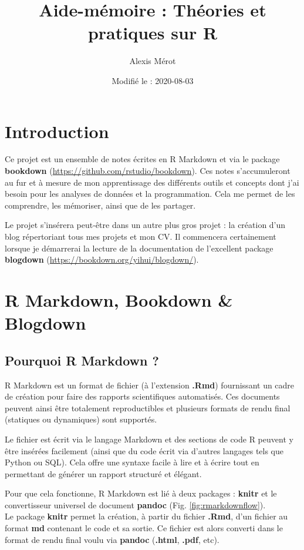 \documentclass[
]{book}
\title{Aide-mémoire : Théories et pratiques sur R}
\author{Alexis Mérot}
\date{Modifié le : 2020-08-03}
\begin{document}
\maketitle

{
\setcounter{tocdepth}{1}
\tableofcontents
}
\hypertarget{introduction}{%
\chapter*{Introduction}\label{introduction}}

Ce projet est un ensemble de notes écrites en R Markdown \citep{R-rmarkdown} et via
le package \textbf{bookdown} (\url{https://github.com/rstudio/bookdown}). Ces notes
s'accumuleront au fur et à mesure de mon apprentissage des différents outils et
concepts dont j'ai besoin pour les analyses de données et la programmation. Cela
me permet de les comprendre, les mémoriser, ainsi que de les partager.

Le projet s'insérera peut-être dans un autre plus gros projet : la création d'un
blog répertoriant tous mes projets et mon CV. Il commencera certainement lorsque
je démarrerai la lecture de la documentation de l'excellent package \textbf{blogdown}
(\url{https://bookdown.org/yihui/blogdown/}).

\hypertarget{rmarkdown}{%
\chapter{R Markdown, Bookdown \& Blogdown}\label{rmarkdown}}

\hypertarget{pourquoi-rmarkdown}{%
\section{Pourquoi R Markdown ?}\label{pourquoi-rmarkdown}}

R Markdown est un format de fichier (à l'extension \textbf{.Rmd}) fournissant un cadre
de création pour faire des rapports scientifiques automatisés. Ces documents
peuvent ainsi être totalement reproductibles et plusieurs formats de rendu
final (statiques ou dynamiques) sont supportés.

Le fichier est écrit via le langage Markdown et des sections de code R peuvent y
être insérées facilement (ainsi que du code écrit via d'autres langages tels
que Python ou SQL). Cela offre une syntaxe facile à lire et à écrire tout en
permettant de générer un rapport structuré et élégant.

Pour que cela fonctionne, R Markdown est lié à deux packages : \textbf{knitr} et le
convertisseur universel de document \textbf{pandoc} (Fig. \ref{fig:rmarkdownflow}).\\
Le package \textbf{knitr} permet la création, à partir du fichier \textbf{.Rmd}, d'un fichier
au format \textbf{md} contenant le code et sa sortie. Ce fichier est alors converti
dans le format de rendu final voulu via \textbf{pandoc} (\textbf{.html}, \textbf{.pdf}, etc).
\end{document}
